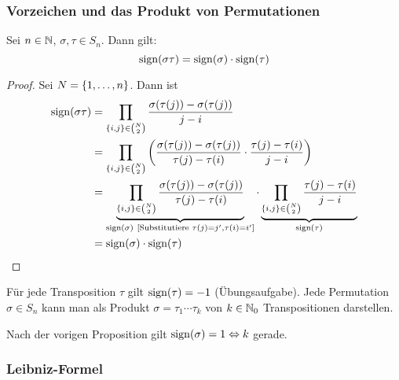 \subsubsection{Vorzeichen und das Produkt von Permutationen}

\begin{thm}
	Sei $ n \in \mathbb N $, $ \sigma,\tau \in S_n $. Dann gilt:
	\begin{equation}
		\operatorname{sign}(\sigma\tau) = \operatorname{sign}(\sigma)\cdot\operatorname{sign}(\tau)
	\end{equation}
\end{thm}
\begin{proof}
	Sei $ N = \{ 1,\ldots,n \} $. Dann ist
	\begin{align*}
		\operatorname{sign}(\sigma\tau) &= \prod_{\{ i,j \} \in \binom{N}{2}} \frac{\sigma(\tau(j)) - \sigma(\tau(j))}{j-i} \\
		&= \prod_{\{ i,j \} \in \binom{N}{2}} \left( \frac{\sigma(\tau(j)) - \sigma(\tau(j))}{\tau(j) - \tau(i)} \cdot \frac{\tau(j) - \tau(i)}{j - i} \right) \\
		&= \underbrace{ \prod_{\{ i,j \} \in \binom{N}{2}} \frac{\sigma(\tau(j)) - \sigma(\tau(j))}{\tau(j) - \tau(i)} }_{\operatorname{sign}(\sigma) \ \left[ \text{Substitutiere } \tau(j)=j', \tau(i)=i' \right]} \cdot \underbrace{ \prod_{\{ i,j \} \in \binom{N}{2}} \frac{\tau(j) - \tau(i)}{j - i} }_{\operatorname{sign}(\tau)} \\
		&= \operatorname{sign}(\sigma) \cdot \operatorname{sign}(\tau) \qedhere
	\end{align*}
\end{proof}
\begin{bem}
	Für jede Transposition $ \tau $ gilt $ \operatorname{sign}(\tau) = -1 $ (Übungsaufgabe). Jede Permutation $ \sigma \in S_n $ kann man als Produkt $ \sigma = \tau_1 \cdots \tau_k $ von $ k \in \mathbb N_0 $ Transpositionen darstellen.
	
	Nach der vorigen Proposition gilt $ \operatorname{sign}(\sigma) = 1 \Leftrightarrow k $ gerade.
\end{bem}

\subsubsection{Leibniz-Formel}

